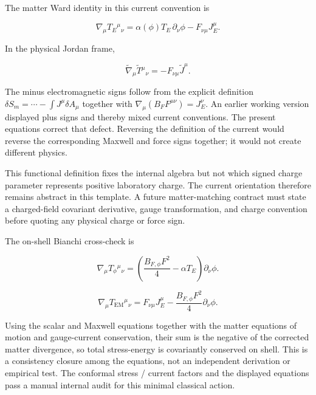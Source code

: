 \documentclass[
  american,
  11pt,
  letterpaper,
]{article}
\begin{document}
The matter Ward identity in this current convention is

\begin{equation}
\nabla_\mu T_E{}^\mu{}_\nu
=\alpha(\phi)T_E\,\partial_\nu\phi-F_{\nu\mu}J_E^\mu.
\tag{17}
\end{equation}

In the physical Jordan frame,

\begin{equation}
\widetilde\nabla_\mu\widetilde T{}^\mu{}_\nu
=-F_{\nu\mu}\widetilde J^\mu.
\tag{18}
\end{equation}

The minus electromagnetic signs follow from the explicit definition \(\delta S_m=\cdots-\int J^\mu\delta A_\mu\) together with \(\nabla_\mu(B_FF^{\mu\nu})=J_E^\nu\). An earlier working version displayed plus signs and thereby mixed current conventions. The present equations correct that defect. Reversing the definition of the current would reverse the corresponding Maxwell and force signs together; it would not create different physics.

This functional definition fixes the internal algebra but not which signed charge parameter represents positive laboratory charge. The current orientation therefore remains abstract in this template. A future matter-matching contract must state a charged-field covariant derivative, gauge transformation, and charge convention before quoting any physical charge or force sign.

The on-shell Bianchi cross-check is

\begin{equation}
\nabla_\mu T_\phi{}^\mu{}_\nu
=\left(\frac{B_{F,\phi}F^2}{4}-\alpha T_E\right)\partial_\nu\phi.
\tag{19}
\end{equation}

\begin{equation}
\nabla_\mu T_{\mathrm{EM}}{}^\mu{}_\nu
=F_{\nu\mu}J_E^\mu-\frac{B_{F,\phi}F^2}{4}\partial_\nu\phi.
\tag{20}
\end{equation}

Using the scalar and Maxwell equations together with the matter equations of motion and gauge-current conservation, their sum is the negative of the corrected matter divergence, so total stress-energy is covariantly conserved on shell. This is a consistency closure among the equations, not an independent derivation or empirical test. The conformal stress / current factors and the displayed equations pass a manual internal audit for this minimal classical action.
\end{document}
